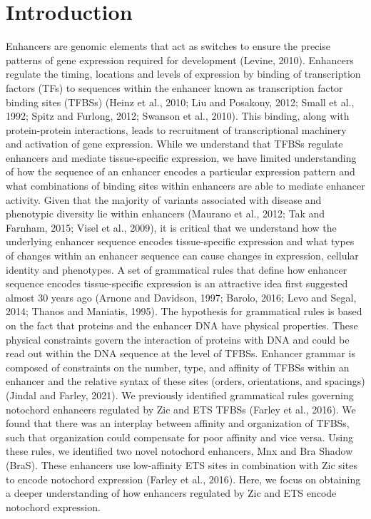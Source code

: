 \section{Introduction}

Enhancers are genomic elements that act as switches to ensure the precise patterns of gene expression required for development (Levine, 2010). Enhancers regulate the timing, locations and levels of expression by binding of transcription factors (TFs) to sequences within the enhancer known as transcription factor binding sites (TFBSs) (Heinz et al., 2010; Liu and Posakony, 2012; Small et al., 1992; Spitz and Furlong, 2012; Swanson et al., 2010). This binding, along with protein-protein interactions, leads to recruitment of transcriptional machinery and activation of gene expression. While we understand that TFBSs regulate enhancers and mediate tissue-specific expression, we have limited understanding of how the sequence of an enhancer encodes a particular expression pattern and what combinations of binding sites within enhancers are able to mediate enhancer activity. Given that the majority of variants associated with disease and phenotypic diversity lie within enhancers (Maurano et al., 2012; Tak and Farnham, 2015; Visel et al., 2009), it is critical that we understand how the underlying enhancer sequence encodes tissue-specific expression and what types of changes within an enhancer sequence can cause changes in expression, cellular identity and phenotypes. 
A set of grammatical rules that define how enhancer sequence encodes tissue-specific expression is an attractive idea first suggested almost 30 years ago (Arnone and Davidson, 1997; Barolo, 2016; Levo and Segal, 2014; Thanos and Maniatis, 1995). The hypothesis for grammatical rules is based on the fact that proteins and the enhancer DNA have physical properties. These physical constraints govern the interaction of proteins with DNA and could be read out within the DNA sequence at the level of TFBSs. Enhancer grammar is composed of constraints on the number, type, and affinity of TFBSs within an enhancer and the relative syntax of these sites (orders, orientations, and spacings) (Jindal and Farley, 2021).
We previously identified grammatical rules governing notochord enhancers regulated by Zic and ETS TFBSs (Farley et al., 2016). We found that there was an interplay between affinity and organization of TFBSs, such that organization could compensate for poor affinity and vice versa. Using these rules, we identified two novel notochord enhancers, Mnx and Bra Shadow (BraS). These enhancers use low-affinity ETS sites in combination with Zic sites to encode notochord expression (Farley et al., 2016). Here, we focus on obtaining a deeper understanding of how enhancers regulated by Zic and ETS encode notochord expression. 


